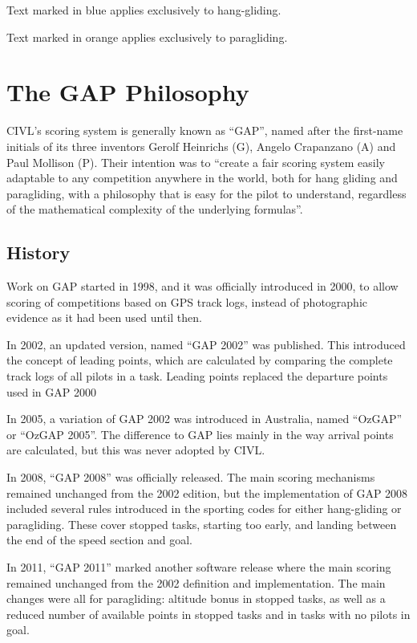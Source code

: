 \documentclass{article}
\begin{document}
\begin{hg}
Text marked in blue applies exclusively to hang-gliding.
\end{hg}

\begin{pg}
Text marked in orange applies exclusively to paragliding.
\end{pg}

\newpage
\section{The GAP Philosophy}
CIVL’s scoring system is generally known as “GAP”, named after the first-name
initials of its three inventors Gerolf Heinrichs (G), Angelo Crapanzano (A) and
Paul Mollison (P). Their intention was to “create a fair scoring system easily
adaptable to any competition anywhere in the world, both for hang gliding and
paragliding, with a philosophy that is easy for the pilot to understand,
regardless of the mathematical complexity of the underlying formulas”.

\subsection{History}
Work on GAP started in 1998, and it was officially introduced in 2000, to allow
scoring of competitions based on GPS track logs, instead of photographic
evidence as it had been used until then.

In 2002, an updated version, named “GAP 2002” was published. This introduced
the concept of leading points, which are calculated by comparing the complete
track logs of all pilots in a task. Leading points replaced the departure
points used in GAP 2000

In 2005, a variation of GAP 2002 was introduced in Australia, named “OzGAP” or
“OzGAP 2005”. The difference to GAP lies mainly in the way arrival points are
calculated, but this was never adopted by CIVL.

In 2008, “GAP 2008” was officially released. The main scoring mechanisms
remained unchanged from the 2002 edition, but the implementation of GAP 2008
included several rules introduced in the sporting codes for either hang-gliding
or paragliding. These cover stopped tasks, starting too early, and landing
between the end of the speed section and goal.

In 2011, “GAP 2011” marked another software release where the main scoring
remained unchanged from the 2002 definition and implementation. The main
changes were all for paragliding: altitude bonus in stopped tasks, as well as
a reduced number of available points in stopped tasks and in tasks with no
pilots in goal.
\end{document}
